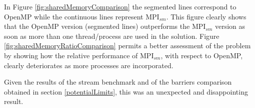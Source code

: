 \medskip

In Figure \ref{fig:sharedMemoryComparison} the segmented lines correspond to OpenMP while the continuous lines represent MPI$_{sm}$. This figure clearly shows that the OpenMP version (segmented lines) outperforms the MPI$_{sm}$ version as soon as more than one thread/process are used in the solution. Figure \ref{fig:sharedMemoryRatioComparison} permits a better assessment of the problem by showing how the relative performance of MPI$_{sm}$, with respect to OpenMP, clearly deteriorates as more processes are incorporated.


\medskip

Given the results of the stream benchmark and of the barriers comparison obtained in section \ref{potentialLimits}, this was an unexpected and disappointing result.

